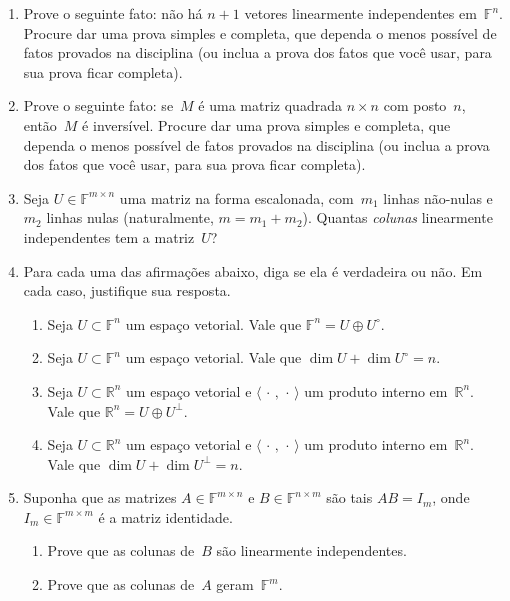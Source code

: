 \documentclass[11pt,reqno,a4paper]{amsart}
\def\RR{{\mathbb R}}
\def\FF{{\mathbb F}}
\def\<{\langle}
\def\>{\rangle}
\def\rmlabel{\upshape({\itshape \roman*\,})}
\newcommand\nlabelQ{\bf\upshape Q\arabic*}
\begin{document}
\begin{enumerate}[label=\nlabelQ]\itemsep8pt

\item Prove o seguinte fato: não há $n+1$ vetores linearmente
  independentes em~$\FF^n$.  Procure dar uma prova simples e completa,
  que dependa o menos possível de fatos provados na disciplina (ou
  inclua a prova dos fatos que você usar, para sua prova ficar
  completa). 

\item Prove o seguinte fato: se~$M$ é uma matriz quadrada $n\times n$
  com posto~$n$, então~$M$ é inversível.  Procure dar uma prova
  simples e completa, que dependa o menos possível de fatos provados
  na disciplina (ou inclua a prova dos fatos que você usar, para sua
  prova ficar completa).

\item Seja $U\in\FF^{m\times n}$ uma matriz na forma escalonada,
  com~$m_1$ linhas não-nulas e~$m_2$ linhas nulas (naturalmente,
  $m=m_1+m_2$).  Quantas \textit{colunas} linearmente independentes
  tem a matriz~$U$?

\item Para cada uma das afirmações abaixo, diga se ela é verdadeira ou
  não.  Em cada caso, justifique sua resposta.
  \begin{enumerate}[label=\rmlabel]
  \item Seja $U\subset\FF^n$ um espaço vetorial.  Vale que
    $\FF^n=U\oplus U^\circ$.
  \item Seja $U\subset\FF^n$ um espaço vetorial.  Vale que
    $\dim U+\dim U^\circ=n$.
  \item Seja $U\subset\RR^n$ um espaço vetorial e
    $\<\,\cdot\,,\,\cdot\,\>$ um produto interno em~$\RR^n$.  Vale que
    $\RR^n=U\oplus U^\perp$.
  \item Seja $U\subset\RR^n$ um espaço vetorial e
    $\<\,\cdot\,,\,\cdot\,\>$ um produto interno em~$\RR^n$.  Vale que
    $\dim U+\dim U^\perp=n$.
  \end{enumerate}

\item Suponha que as matrizes $A\in\FF^{m\times n}$ e
  $B\in\FF^{n\times m}$ são tais $AB=I_m$, onde~$I_m\in\FF^{m\times
    m}$ é a matriz identidade. 
  \begin{enumerate}[label=\rmlabel]
  \item Prove que as colunas de~$B$ são linearmente independentes. 
  \item Prove que as colunas de~$A$ geram~$\FF^m$.
  \end{enumerate}


\end{enumerate}
\end{document}
